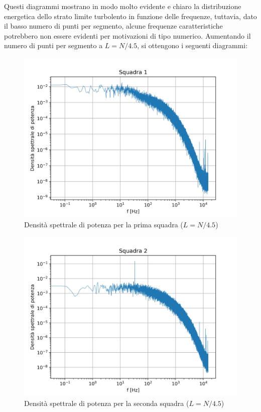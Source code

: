 \noindent Questi diagrammi mostrano in modo molto evidente e chiaro la distribuzione energetica dello strato limite turbolento in funzione delle frequenze, tuttavia, dato il basso numero di punti per segmento, alcune frequenze caratteristiche potrebbero non essere evidenti per motivazioni di tipo numerico. Aumentando il numero di punti per segmento a $L=N/4.5$, si ottengono i seguenti diagrammi:

\begin{figure}[H]
    \centering
    \includegraphics[width=.7\textwidth]{images/9/sq1timeserieswelch.png}
    \caption{Densità spettrale di potenza per la prima squadra ($L=N/4.5$)}
\end{figure}

\begin{figure}[H]
    \centering
    \includegraphics[width=.8\textwidth]{images/9/sq2timeserieswelch.png}
    \caption{Densità spettrale di potenza per la seconda squadra ($L=N/4.5$)}
\end{figure}

